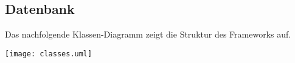 \subsection{Datenbank}
Das nachfolgende Klassen-Diagramm zeigt die Struktur des Frameworks auf.

\vspace{2mm}
\texttt{[image: classes.uml]}
\vspace{2mm}
